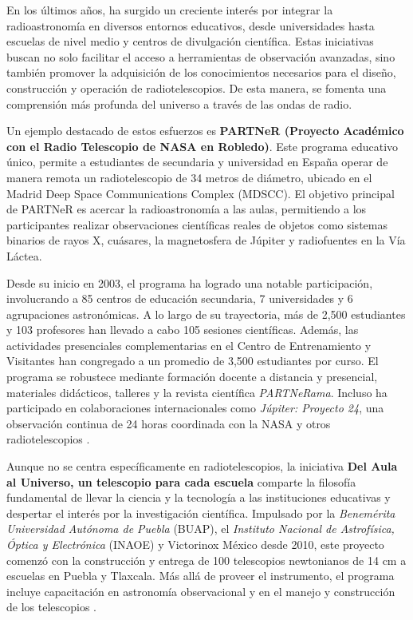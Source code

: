 En los últimos años, ha surgido un creciente interés por integrar la
radioastronomía en diversos entornos educativos, desde universidades hasta
escuelas de nivel medio y centros de divulgación científica.
Estas iniciativas buscan no solo facilitar el acceso a herramientas de
observación avanzadas, sino también promover la adquisición de los
conocimientos necesarios para el diseño, construcción y operación de
radiotelescopios.
De esta manera, se fomenta una comprensión más profunda del universo a través
de las ondas de radio.

Un ejemplo destacado de estos esfuerzos es \textbf{PARTNeR (Proyecto Académico
con el Radio Telescopio de NASA en Robledo)}.
Este programa educativo único,  permite a estudiantes de secundaria y universidad
en España operar de manera remota un radiotelescopio de 34 metros de diámetro,
ubicado en el Madrid Deep Space Communications Complex (MDSCC).
El objetivo principal de PARTNeR es acercar la radioastronomía a las aulas,
permitiendo a los participantes realizar observaciones científicas reales de
objetos como sistemas binarios de rayos X, cuásares, la magnetosfera de Júpiter
y radiofuentes en la Vía Láctea.

Desde su inicio en 2003, el programa ha logrado una notable participación,
involucrando a 85 centros de educación secundaria, 7 universidades y 6
agrupaciones astronómicas.
A lo largo de su trayectoria, más de 2,500 estudiantes y 103 profesores han
llevado a cabo 105 sesiones científicas.
Además, las actividades presenciales complementarias en el Centro de
Entrenamiento y Visitantes han congregado a un promedio de 3,500 estudiantes
por curso.
El programa se robustece mediante formación docente a distancia y presencial,
materiales didácticos, talleres y la revista científica \textit{PARTNeRama}.
Incluso ha participado en colaboraciones internacionales como \textit{Júpiter:
Proyecto 24}, una observación continua de 24 horas coordinada con la NASA
y otros radiotelescopios \cite{Vaquerizo2010}.

Aunque no se centra específicamente en radiotelescopios, la iniciativa
\textbf{Del Aula al Universo, un telescopio para cada escuela} comparte la
filosofía fundamental de llevar la ciencia y la tecnología a las instituciones
educativas y despertar el interés por la investigación científica.
Impulsado por la \emph{Benemérita Universidad Autónoma de Puebla} (BUAP), el
\emph{Instituto Nacional de Astrofísica, Óptica y Electrónica} (INAOE)
y Victorinox México desde 2010, este proyecto comenzó con la construcción
y entrega de 100 telescopios newtonianos de 14 cm a escuelas en Puebla
y Tlaxcala.
Más allá de proveer el instrumento, el programa incluye capacitación en
astronomía observacional y en el manejo y construcción de los telescopios
\cite{DifusiondelaCienciaylaTecnologia2011}.

